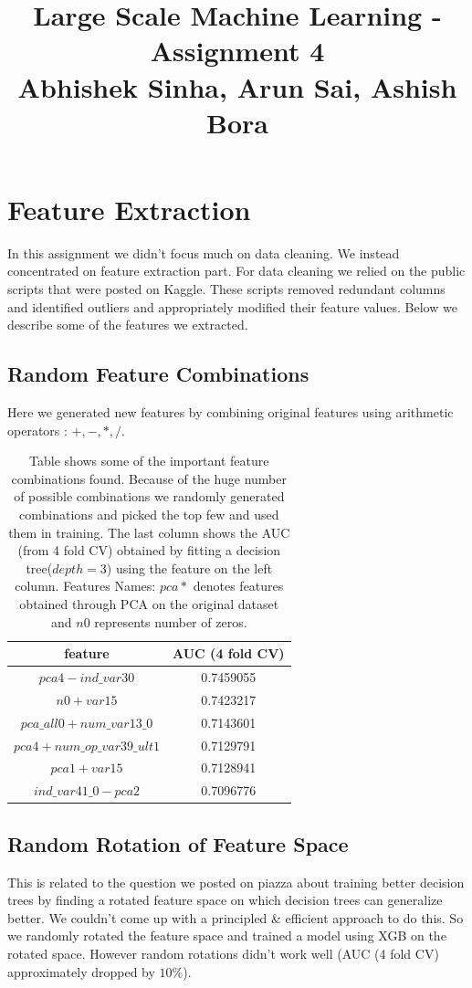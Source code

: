 \documentclass{article}
\begin{document}
\title{Large Scale Machine Learning - Assignment 4\\Abhishek Sinha, Arun Sai, Ashish Bora}
\maketitle
\section{Feature Extraction}
In this assignment we didn't focus much on data cleaning. We instead concentrated on feature extraction part. For data cleaning we relied on the public scripts that were posted on Kaggle. These scripts removed redundant columns and identified outliers and appropriately modified their feature values.
Below we describe some of the features we extracted. 
\subsection{Random Feature Combinations}
Here we generated new features by combining original features using arithmetic operators : $+, -, * , /$.
\begin{table}[h!]
\begin{center}
\begin{tabular}{ |c|c| } 
\hline
feature&AUC (4 fold CV)\\ \hline
$pca4-ind\_var30$&0.7459055\\ \hline
$n0+var15$&0.7423217\\ \hline
$pca\_all0+num\_var13\_0$&0.7143601\\ \hline
$pca4+num\_op\_var39\_ult1$&0.7129791\\ \hline
$pca1+var15$&0.7128941\\ \hline
$ind\_var41\_0-pca2$&0.7096776\\ \hline
\end{tabular}
\end{center}
\caption{Table shows some of the important feature combinations found. Because of the huge number of possible combinations we randomly generated combinations and picked the top few and used them in training. The last column shows the AUC (from 4 fold CV) obtained by fitting a decision tree($depth=3$) using the feature on the left column. Features Names: $pca*$ denotes features obtained through PCA on the original dataset and $n0$  represents number of zeros.}
\end{table}
\subsection{Random Rotation of Feature Space}
This is related to the question we posted on piazza about training better decision trees by finding a rotated feature space on which decision trees can generalize better. We couldn't come up with a principled \& efficient approach to do this. So we randomly rotated the feature space and trained a model using XGB on the rotated space. However random rotations didn't work well (AUC (4 fold CV) approximately dropped by $10\%$). 
\end{document}
